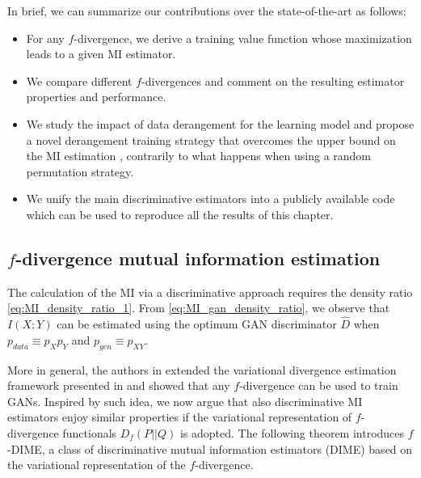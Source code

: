 In brief, we can summarize our contributions over the state-of-the-art as follows:
\begin{itemize}
    \item For any $f$-divergence, we derive a training value function whose maximization leads to a given MI estimator.
    \item We compare different $f$-divergences and comment on the resulting estimator properties and performance.
    \item We study the impact of data derangement for the learning model and propose a novel derangement training strategy that overcomes the upper bound on the MI estimation \cite{McAllester2019}, contrarily to what happens when using a random permutation strategy.
    \item We unify the main discriminative estimators into a publicly available code which can be used to reproduce all the results of this chapter.
\end{itemize}

\subsection{$f$-divergence mutual information estimation}
\label{subsec:mi_f-DIME}
The calculation of the MI via a discriminative approach requires the density ratio \eqref{eq:MI_density_ratio_1}.
From \eqref{eq:MI_gan_density_ratio}, we observe that $I(X;Y)$ can be estimated using the optimum GAN discriminator $\hat{D}$ when $p_{data}\equiv  p_{X}p_Y$ and $p_{gen} \equiv p_{XY}$.

More in general, the authors in \cite{Nowozin2016} extended the variational divergence estimation framework presented in \cite{Nguyen2010} and showed that any $f$-divergence can be used to train GANs. Inspired by such idea, we now argue that also discriminative MI estimators enjoy similar properties if the variational representation of $f$-divergence functionals $D_f(P||Q)$ is adopted.
The following theorem introduces $f$-DIME, a class of discriminative mutual information estimators (DIME) based on the variational representation of the $f$-divergence.
 
